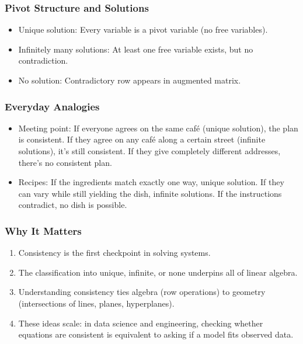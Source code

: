 \documentclass[
  letterpaper,
  DIV=11,
  numbers=noendperiod]{scrreprt}
\providecommand{\tightlist}{%
  \setlength{\itemsep}{0pt}\setlength{\parskip}{0pt}}
\begin{document}
\subsubsection{Pivot Structure and
Solutions}\label{pivot-structure-and-solutions}

\begin{itemize}
\tightlist
\item
  Unique solution: Every variable is a pivot variable (no free
  variables).
\item
  Infinitely many solutions: At least one free variable exists, but no
  contradiction.
\item
  No solution: Contradictory row appears in augmented matrix.
\end{itemize}

\subsubsection{Everyday Analogies}\label{everyday-analogies-21}

\begin{itemize}
\tightlist
\item
  Meeting point: If everyone agrees on the same café (unique solution),
  the plan is consistent. If they agree on any café along a certain
  street (infinite solutions), it's still consistent. If they give
  completely different addresses, there's no consistent plan.
\item
  Recipes: If the ingredients match exactly one way, unique solution. If
  they can vary while still yielding the dish, infinite solutions. If
  the instructions contradict, no dish is possible.
\end{itemize}

\subsubsection{Why It Matters}\label{why-it-matters-21}

\begin{enumerate}
\def\labelenumi{\arabic{enumi}.}
\tightlist
\item
  Consistency is the first checkpoint in solving systems.
\item
  The classification into unique, infinite, or none underpins all of
  linear algebra.
\item
  Understanding consistency ties algebra (row operations) to geometry
  (intersections of lines, planes, hyperplanes).
\item
  These ideas scale: in data science and engineering, checking whether
  equations are consistent is equivalent to asking if a model fits
  observed data.
\end{enumerate}
\end{document}
